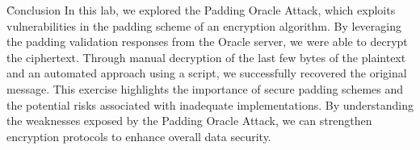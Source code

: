 \documentclass{ieee}
\begin{document}
\h{Conclusion}
In this lab, we explored the Padding Oracle Attack, which exploits vulnerabilities in the padding scheme of an encryption algorithm. By leveraging the padding validation responses from the Oracle server, we were able to decrypt the ciphertext. Through manual decryption of the last few bytes of the plaintext and an automated approach using a script, we successfully recovered the original message. This exercise highlights the importance of secure padding schemes and the potential risks associated with inadequate implementations. By understanding the weaknesses exposed by the Padding Oracle Attack, we can strengthen encryption protocols to enhance overall data security.
\end{document}
